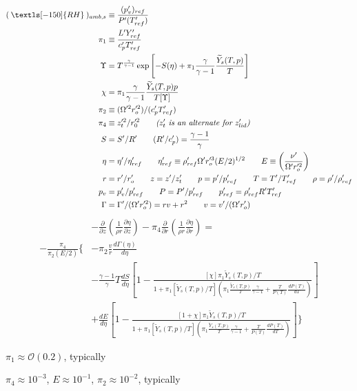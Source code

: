 \documentclass[preprint, prX]{revtex4}
\newcommand{\pfrac}[2]{\left(\frac{#1}{#2}\right)}
\newcommand{\dd}[2]{\frac{d#1}{d#2}}
\newcommand{\pd}[2]{\frac{\partial#1}{\partial#2}}
\newcommand{\gogmo}{\frac{\gamma}{\gamma-1}}
\newcommand{\rh}{\:\textls[-150]{RH}\:}
\begin{document}
\begin{itemize}
\begin{equation}
\begin{split}
(\rh)_{amb,s} &\equiv \frac{(p_v')_{ref}}{P'(T_{ref}')}\\
\pi_1 &\equiv \frac{L'Y_{ref}'}{c_p' T_{ref}'} \\
\Upsilon &= T^\gogmo \exp\left[ -S(\eta) + \pi_1 \gogmo \frac{\widetilde{Y}_s(T,p)}{T}\right] \\
\chi &= \pi_1 \gogmo \frac{\widetilde{Y}_s(T,p) p}{T[\Upsilon]} \\
\pi_2 &\equiv (\Omega'^2 r_o'^2)/(c_p'T_{ref}') \\
\pi_4 &\equiv z_t'^2 / r_0'^2 \qquad \textit{($z_t'$ is an alternate for $z_{lid}'$)} \\
S &= S'/R' \qquad (R'/c_p') = \frac{\gamma-1}{\gamma} \\
\eta &= \eta'/\eta_{ref}' \qquad \eta_{ref}' \equiv \rho_{ref}'\Omega' r_o'^3 (E/2)^{1/2} \qquad E \equiv \pfrac{\nu'}{\Omega' r_o'^2}\\
r &= r'/r_o' \qquad z= z'/z_t' \qquad p= p'/p_{ref}' \qquad T=T'/T_{ref}' \qquad \rho = \rho'/\rho_{ref}' \\
p_v &= p_v'/p_{ref}' \qquad P= P'/p_{ref}' \qquad p_{ref}' = \rho_{ref}'R'T_{ref}' \\
\Gamma &= \Gamma'/(\Omega'r_o'^2) = r v + r^2 \qquad v = v'/(\Omega' r_o') 
\end{split}
\end{equation}
\begin{equation}
\begin{split}
&-\pd{}{z} \left( \frac{1}{\rho r}\pd{\eta}{z} \right) - \pi_4 \pd{}{r} \left( \frac{1}{\rho r}\pd{\eta}{r} \right) = \\
-\frac{\pi_4}{\pi_2(E/2)} \Bigg\{&- \pi_2 \frac{v}{r}\dd{\Gamma(\eta)}{\eta} \\
&-\frac{\gamma -1}{\gamma}T \dd{S}{\eta}\left[ 1- \frac{[\chi]\pi_1 \widetilde{Y}_s(T,p)/T}{1+\pi_1[\widetilde{Y}_s(T,p)/T]\left( \pi_1 \frac{\widetilde{Y}_s(T,p)}{T}\gogmo + \frac{T}{P(T)}\dd{P(T)}{T}\right)}\right] \\
&+ \dd{E}{\eta}\left[ 1- \frac{[1+\chi]\pi_1 \widetilde{Y}_s(T,p)/T}{1+\pi_1[\widetilde{Y}_s(T,p)/T]\left( \pi_1 \frac{\widetilde{Y}_s(T,p)}{T}\gogmo + \frac{T}{P(T)}\dd{P(T)}{T}\right)}\right] 
\Bigg\}
\end{split}
\end{equation}

$\pi_1 \approx \mathcal{O}(0.2)$, typically

$\pi_4 \approx 10^{-3}$, $E \approx 10^{-1}$, $\pi_2 \approx 10^{-2}$, typically

\end{itemize}
\end{document}
